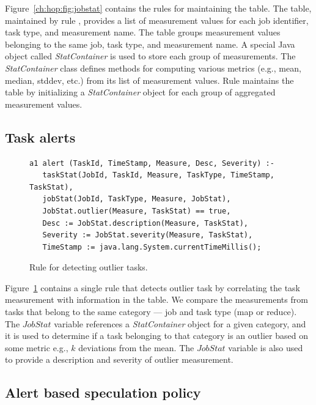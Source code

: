Figure~\ref{ch:hop:fig:jobstat} contains the rules for maintaining the
 table.  The  table, maintained by rule ,
provides a list of measurement values for each job identifier, task type, and
measurement name.  The  table groups measurement values belonging
to the same job, task type, and measurement name.  A special Java object called
{\em StatContainer} is used to store each group of measurements.  The {\em
StatContainer} class defines methods for computing various metrics (e.g., mean,
median, stddev, etc.) from its list of measurement values.  Rule 
maintains the  table by initializing a {\em StatContainer} object
for each group of aggregated measurement values.


\subsection{Task alerts} 

\begin{figure}
\ssp
\centering
\begin{lstlisting}
a1 alert (TaskId, TimeStamp, Measure, Desc, Severity) :-
   taskStat(JobId, TaskId, Measure, TaskType, TimeStamp, TaskStat),
   jobStat(JobId, TaskType, Measure, JobStat),
   JobStat.outlier(Measure, TaskStat) == true,
   Desc := JobStat.description(Measure, TaskStat),
   Severity := JobStat.severity(Measure, TaskStat),
   TimeStamp := java.lang.System.currentTimeMillis();
\end{lstlisting}
\caption{\label{ch:hop:fig:outlier} Rule for detecting outlier tasks. }
\end{figure}

Figure~\ref{ch:hop:fig:outlier} contains a single rule that detects outlier
task by correlating the task measurement with information in the 
table.  We compare the measurements from tasks that belong to the same category
--- job and task type (map or reduce).  The $JobStat$ variable references a {\em
StatContainer} object for a given category, and it is used to determine if a
task belonging to that category is an outlier based on some metric e.g., $k$
deviations from the mean.  The $JobStat$ variable is also used to provide a
description and severity of outlier measurement.

\subsection{Alert based speculation policy} 
\label{ch:hop:sec:speculation}

